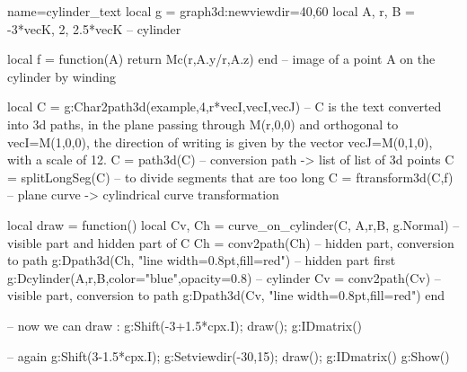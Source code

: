 \documentclass[border=5pt]{standalone}%
\begin{document}
\begin{luadraw}{name=cylinder_text}
local g = graph3d:new{viewdir={40,60}}
local A, r, B = -3*vecK, 2, 2.5*vecK -- cylinder

local f = function(A) return Mc(r,A.y/r,A.z) end -- image of a point A on the cylinder by winding

local C = g:Char2path3d(example,4,{r*vecI,vecI},vecJ)
-- C is the text converted into 3d paths, in the plane passing through M(r,0,0) and orthogonal to vecI=M(1,0,0), the direction of writing is given by the vector vecJ=M(0,1,0), with a scale of 12.
C = path3d(C) -- conversion path -> list of list of 3d points
C = splitLongSeg(C) -- to divide segments that are too long
C = ftransform3d(C,f) -- plane curve -> cylindrical curve transformation

local draw = function()
    local Cv, Ch = curve_on_cylinder(C, {A,r,B}, g.Normal) -- visible part and hidden part of C
    Ch = conv2path(Ch) -- hidden part, conversion to path
    g:Dpath3d(Ch, "line width=0.8pt,fill=red") -- hidden part first
    g:Dcylinder(A,r,B,{color="blue",opacity=0.8}) -- cylinder
    Cv = conv2path(Cv) -- visible part, conversion to path
    g:Dpath3d(Cv, "line width=0.8pt,fill=red")
end

-- now we can draw :
g:Shift(-3+1.5*cpx.I); draw(); g:IDmatrix()

-- again
g:Shift(3-1.5*cpx.I); g:Setviewdir(-30,15); draw(); g:IDmatrix()
g:Show()
\end{luadraw}
\end{document}
